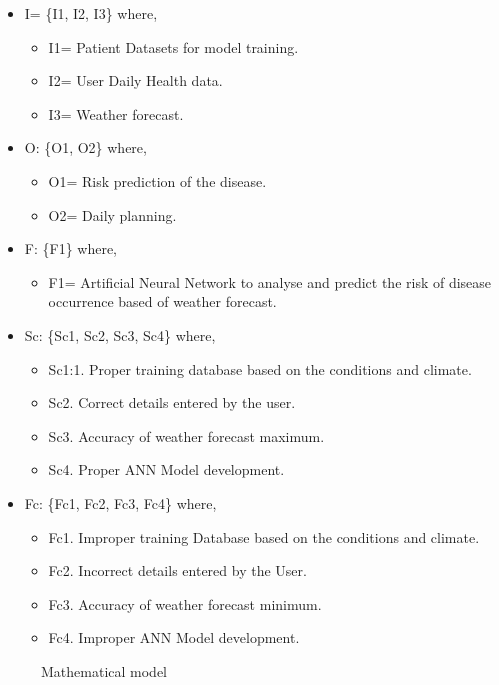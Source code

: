 \documentclass[12pt,a4paper]{report}
\begin{document}
\begin{itemize}
\item I= \{I1, I2, I3\}
where,
\begin{itemize}
\item I1=  Patient Datasets for model training.
\item I2=  User Daily Health data.
\item I3=  Weather forecast.
\end{itemize}
\item O: \{O1, O2\}
where,
\begin{itemize}
\item O1=  Risk prediction of the disease.
\item O2=  Daily planning.
\end{itemize}
\item F: \{F1\}
where,
\begin{itemize}
\item F1= Artificial Neural Network to analyse and predict the risk of disease occurrence based of weather                   forecast. 

\end{itemize}
\item Sc: \{Sc1, Sc2, Sc3, Sc4\}
where,
\begin{itemize}
\item Sc1:1. Proper training database based on the conditions and climate.
\item Sc2. Correct details entered by the user.
\item Sc3. Accuracy of weather forecast maximum.
\item Sc4. Proper ANN Model development.
\end{itemize}
\item Fc: \{Fc1, Fc2, Fc3, Fc4\}
where,
\begin{itemize}
\item Fc1. Improper training Database based on the conditions and climate.
\item Fc2. Incorrect details entered by the User.
\item Fc3. Accuracy of weather forecast minimum.
\item Fc4. Improper ANN Model development.

\end{itemize}
\end{itemize}
\begin{figure}[!h]
	
			\caption{Mathematical model}
	
\end{figure}
\end{document}
